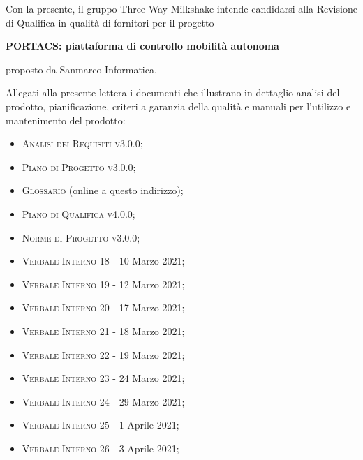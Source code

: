 \documentclass[10pt,stdletter,dateno,sigright]{newlfm}  %
\begin{document}
    \begin{newlfm}


        Con la presente, il gruppo Three Way Milkshake intende candidarsi alla Revisione di Qualifica in qualità di fornitori per il progetto
        \begin{center}
            \textbf{PORTACS: piattaforma di controllo mobilità autonoma}
        \end{center}
        proposto da Sanmarco Informatica.

        Allegati alla presente lettera i documenti che illustrano in dettaglio analisi del prodotto, pianificazione, criteri a garanzia della qualità e manuali per l'utilizzo e mantenimento del prodotto:
	\begin{multicols}{2}
        \begin{itemize}
            \item \textsc{Analisi dei Requisiti v3.0.0;}
            \item \textsc{Piano di Progetto v3.0.0;}
            \item \textsc{Glossario }(\href{https://github.com/Three-Way-Milkshake/docs/wiki/Glossario}{\underline{online a questo indirizzo}});
            \item \textsc{Piano di Qualifica v4.0.0;}
            \item \textsc{Norme di Progetto v3.0.0;}
            \item \textsc{Verbale Interno 18} - 10 Marzo 2021;
            \item \textsc{Verbale Interno 19} - 12 Marzo 2021;
            \item \textsc{Verbale Interno 20} - 17 Marzo 2021;
            \item \textsc{Verbale Interno 21} - 18 Marzo 2021;
            \item \textsc{Verbale Interno 22} - 19 Marzo 2021;
            \item \textsc{Verbale Interno 23} - 24 Marzo 2021;
            \item \textsc{Verbale Interno 24} - 29 Marzo 2021;
            \item \textsc{Verbale Interno 25} - 1 Aprile 2021;
            \item \textsc{Verbale Interno 26} - 3 Aprile 2021;

\end{itemize}
\end{multicols}
\end{newlfm}
\end{document}
